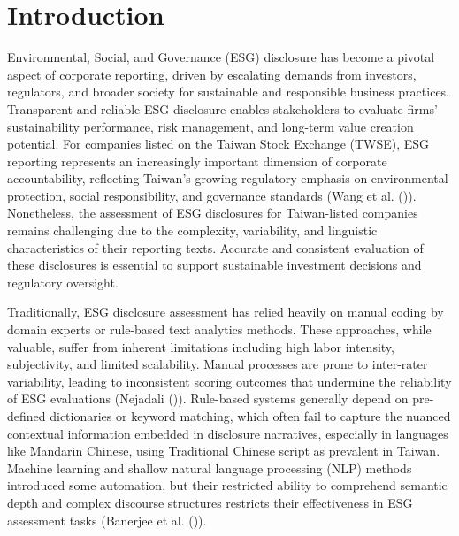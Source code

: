 \documentclass[
  12pt,
]{article}
\begin{document}
\section{Introduction}\label{introduction}

Environmental, Social, and Governance (ESG) disclosure has become a
pivotal aspect of corporate reporting, driven by escalating demands from
investors, regulators, and broader society for sustainable and
responsible business practices. Transparent and reliable ESG disclosure
enables stakeholders to evaluate firms' sustainability performance, risk
management, and long-term value creation potential. For companies listed
on the Taiwan Stock Exchange (TWSE), ESG reporting represents an
increasingly important dimension of corporate accountability, reflecting
Taiwan's growing regulatory emphasis on environmental protection, social
responsibility, and governance standards (Wang et al.
()). Nonetheless, the assessment of ESG
disclosures for Taiwan-listed companies remains challenging due to the
complexity, variability, and linguistic characteristics of their
reporting texts. Accurate and consistent evaluation of these disclosures
is essential to support sustainable investment decisions and regulatory
oversight.

Traditionally, ESG disclosure assessment has relied heavily on manual
coding by domain experts or rule-based text analytics methods. These
approaches, while valuable, suffer from inherent limitations including
high labor intensity, subjectivity, and limited scalability. Manual
processes are prone to inter-rater variability, leading to inconsistent
scoring outcomes that undermine the reliability of ESG evaluations
(Nejadali ()). Rule-based systems
generally depend on pre-defined dictionaries or keyword matching, which
often fail to capture the nuanced contextual information embedded in
disclosure narratives, especially in languages like Mandarin Chinese,
using Traditional Chinese script as prevalent in Taiwan. Machine
learning and shallow natural language processing (NLP) methods
introduced some automation, but their restricted ability to comprehend
semantic depth and complex discourse structures restricts their
effectiveness in ESG assessment tasks (Banerjee et al.
()).
\end{document}
